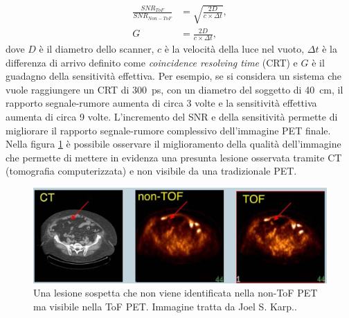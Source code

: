 \begin{equation}
	\begin{split}
		\frac{SNR_{ToF}}{SNR_{Non-ToF}}&=\sqrt{\frac{2D}{c \times \Delta t}}, \\
		G&=\frac{2D}{c\times\Delta t},
	\end{split}
\end{equation}
dove $D$ è il diametro dello scanner, $c$ è la velocità della luce nel vuoto, $\Delta t$ è la differenza di arrivo definito come \textit{coincidence resolving time} (CRT) e $G$ è il guadagno della sensitività  effettiva. Per esempio, se si considera un sistema che vuole raggiungere un CRT di \SI{300}{\pico\second}, con un diametro del soggetto di \SI{40}{\centi\meter}, il rapporto segnale-rumore aumenta di circa 3 volte e la sensitività effettiva aumenta di circa 9 volte. L'incremento del SNR e della sensitività permette di migliorare il rapporto segnale-rumore complessivo dell'immagine PET finale. Nella figura \ref{fig:tof_image} è possibile osservare il miglioramento della qualità dell'immagine che permette di mettere in evidenza una presunta lesione osservata tramite CT (tomografia computerizzata) e non visibile da una tradizionale PET.
\begin{figure}[tbh]
	\centering
	\includegraphics[width=\linewidth]{./ImageFiles/tof_image.jpg}
	\caption{Una lesione sospetta che non viene identificata nella non-ToF PET ma visibile nella ToF PET. Immagine tratta da Joel S. Karp.\cite{Karp2006}.}
	\label{fig:tof_image}
\end{figure}
















